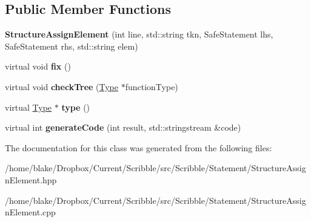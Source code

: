 \subsection*{Public Member Functions}
\begin{DoxyCompactItemize}
\item 
\hypertarget{class_scribble_core_1_1_structure_assign_element_a4289eb4cce8811f2662842c21dc2eaba}{{\bfseries Structure\-Assign\-Element} (int line, std\-::string tkn, Safe\-Statement lhs, Safe\-Statement rhs, std\-::string elem)}\label{class_scribble_core_1_1_structure_assign_element_a4289eb4cce8811f2662842c21dc2eaba}

\item 
\hypertarget{class_scribble_core_1_1_structure_assign_element_ac805dce2630461602792ce2302092c11}{virtual void {\bfseries fix} ()}\label{class_scribble_core_1_1_structure_assign_element_ac805dce2630461602792ce2302092c11}

\item 
\hypertarget{class_scribble_core_1_1_structure_assign_element_a4b542e99d4223248f3eba004a9a1aa37}{virtual void {\bfseries check\-Tree} (\hyperlink{class_scribble_core_1_1_type}{Type} $\ast$function\-Type)}\label{class_scribble_core_1_1_structure_assign_element_a4b542e99d4223248f3eba004a9a1aa37}

\item 
\hypertarget{class_scribble_core_1_1_structure_assign_element_adefc987e58f40dbe43bf4a55f02f1ebd}{virtual \hyperlink{class_scribble_core_1_1_type}{Type} $\ast$ {\bfseries type} ()}\label{class_scribble_core_1_1_structure_assign_element_adefc987e58f40dbe43bf4a55f02f1ebd}

\item 
\hypertarget{class_scribble_core_1_1_structure_assign_element_a88a62fc4691dda741e01cc08690ad986}{virtual int {\bfseries generate\-Code} (int result, std\-::stringstream \&code)}\label{class_scribble_core_1_1_structure_assign_element_a88a62fc4691dda741e01cc08690ad986}

\end{DoxyCompactItemize}


The documentation for this class was generated from the following files\-:\begin{DoxyCompactItemize}
\item 
/home/blake/\-Dropbox/\-Current/\-Scribble/src/\-Scribble/\-Statement/Structure\-Assign\-Element.\-hpp\item 
/home/blake/\-Dropbox/\-Current/\-Scribble/src/\-Scribble/\-Statement/Structure\-Assign\-Element.\-cpp\end{DoxyCompactItemize}
